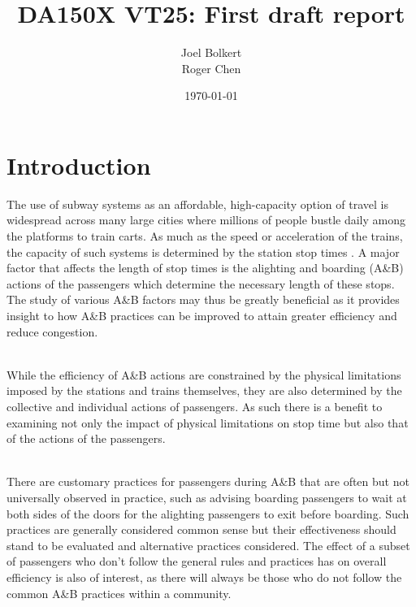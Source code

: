 \documentclass{kththesis}
\title{DA150X VT25: First draft report}
\author{Joel Bolkert\\ Roger Chen}
\date{\today}
\begin{document}
\frontmatter

\titlepage

\begin{abstract}

\end{abstract}


\begin{otherlanguage}{swedish}
  \begin{abstract}
  \end{abstract}
\end{otherlanguage}


\tableofcontents


\mainmatter


\chapter{Introduction}
The use of subway systems as an affordable, high-capacity option of travel is widespread across many large cities where millions of people bustle daily among the platforms to train carts. As much as the speed or acceleration of the trains, the capacity of such systems is determined by the station stop times \parencite{harris2010}. A major factor that affects the length of stop times is the alighting and boarding (A\&B) actions of the passengers which determine the necessary length of these stops. The study of various A\&B factors may thus be greatly beneficial as it provides insight to how A\&B practices can be improved to attain greater efficiency and reduce congestion.

\noindent
\\
While the efficiency of A\&B actions are constrained by the physical limitations imposed by the stations and trains themselves, they are also determined by the collective and individual actions of passengers. As such there is a benefit to examining not only the impact of physical limitations on stop time but also that of the actions of the passengers.

\noindent
\\
There are customary practices for passengers during A\&B that are often but not universally observed in practice, such as advising boarding passengers to wait at both sides of the doors for the alighting passengers to exit before boarding. Such practices are generally considered common sense but their effectiveness should stand to be evaluated and alternative practices considered. The effect of a subset of passengers who don’t follow the general rules and practices has on overall efficiency is also of interest, as there will always be those who do not follow the common A\&B practices within a community.
\end{document}
